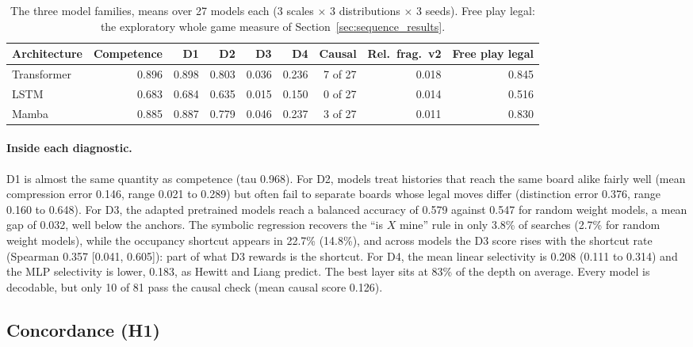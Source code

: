 \documentclass[11pt]{scrartcl}
\begin{document}
\begin{table}[H]
    \centering
    \small
    \setlength{\tabcolsep}{4.5pt}
    \begin{tabular}{lrrrrrrrr}
    \toprule
    Architecture & Competence & D1 & D2 & D3 & D4 & Causal & Rel.\ frag.\ v2 & Free play legal \\
    \midrule
    Transformer & 0.896 & 0.898 & 0.803 & 0.036 & 0.236 & 7 of 27 & 0.018 & 0.845 \\
    LSTM        & 0.683 & 0.684 & 0.635 & 0.015 & 0.150 & 0 of 27 & 0.014 & 0.516 \\
    Mamba       & 0.885 & 0.887 & 0.779 & 0.046 & 0.237 & 3 of 27 & 0.011 & 0.830 \\
    \bottomrule
    \end{tabular}
    \caption{The three model families, means over 27 models each (3 scales $\times$ 3 distributions $\times$ 3
    seeds). Free play legal: the exploratory whole game measure of Section~\ref{sec:sequence_results}.}
    \label{tab:families}
\end{table}

\paragraph{Inside each diagnostic.} D1 is almost the same quantity as competence (tau 0.968). For D2, models
treat histories that reach the same board alike fairly well (mean compression error 0.146, range 0.021 to
0.289) but often fail to separate boards whose legal moves differ (distinction error 0.376, range 0.160 to
0.648). For D3, the adapted pretrained models reach a balanced accuracy of 0.579 against 0.547 for random
weight models, a mean gap of 0.032, well below the anchors. The symbolic regression recovers the ``is $X$
mine'' rule in only 3.8\% of searches (2.7\% for random weight models), while the occupancy shortcut appears in
22.7\% (14.8\%), and across models the D3 score rises with the shortcut rate (Spearman 0.357 [0.041, 0.605]):
part of what D3 rewards is the shortcut. For D4, the mean linear selectivity is 0.208 (0.111 to 0.314) and the
MLP selectivity is lower, 0.183, as Hewitt and Liang predict. The best layer sits at 83\% of the depth on
average. Every model is decodable, but only 10 of 81 pass the causal check (mean causal score 0.126).

\subsection{Concordance (H1)}
\label{sec:h1}
\end{document}
